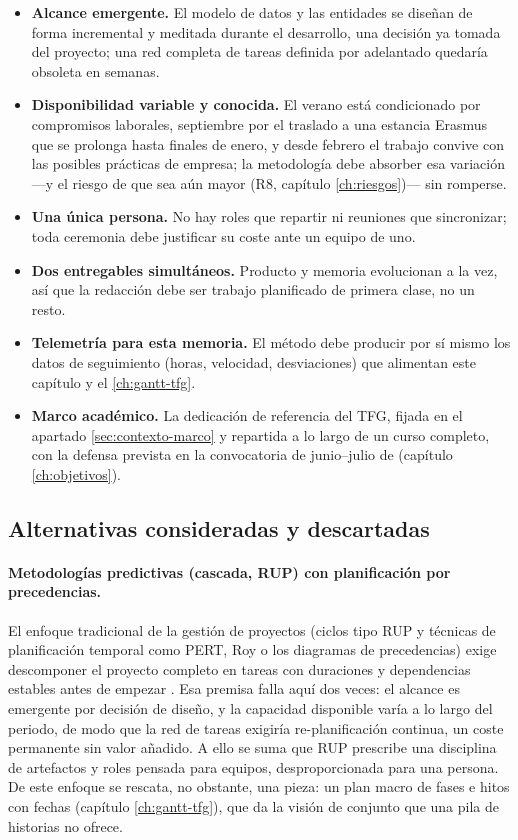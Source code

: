 \begin{itemize}
  \item \textbf{Alcance emergente.}
        El modelo de datos y las entidades se diseñan de forma incremental y meditada durante el desarrollo, una decisión ya tomada del proyecto; una red completa de tareas definida por adelantado quedaría obsoleta en semanas.
  \item \textbf{Disponibilidad variable y conocida.}
        El verano está condicionado por compromisos laborales, septiembre por el traslado a una estancia Erasmus que se prolonga hasta finales de enero, y desde febrero el trabajo convive con las posibles prácticas de empresa; la metodología debe absorber esa variación —y el riesgo de que sea aún mayor (R8, capítulo \ref{ch:riesgos})— sin romperse.
  \item \textbf{Una única persona.}
        No hay roles que repartir ni reuniones que sincronizar; toda ceremonia debe justificar su coste ante un equipo de uno.
  \item \textbf{Dos entregables simultáneos.}
        Producto y memoria evolucionan a la vez, así que la redacción debe ser trabajo planificado de primera clase, no un resto.
  \item \textbf{Telemetría para esta memoria.}
        El método debe producir por sí mismo los datos de seguimiento (horas, velocidad, desviaciones) que alimentan este capítulo y el \ref{ch:gantt-tfg}.
  \item \textbf{Marco académico.}
        La dedicación de referencia del \ac{TFG}, fijada en el apartado \ref{sec:contexto-marco} y repartida a lo largo de un curso completo, con la defensa prevista en la convocatoria de junio--julio de \thesisYear{} (capítulo \ref{ch:objetivos}).
\end{itemize}

\subsection{Alternativas consideradas y descartadas}
\label{sec:metodologia-alternativas}

\paragraph{Metodologías predictivas (cascada, \acs{RUP}) con planificación por precedencias.}
El enfoque tradicional de la gestión de proyectos (ciclos tipo \ac{RUP} y técnicas de planificación temporal como \ac{PERT}, Roy o los diagramas de precedencias) exige descomponer el proyecto completo en tareas con duraciones y dependencias estables antes de empezar \parencite{kruchten-rup, pmi-pmbok}.
Esa premisa falla aquí dos veces: el alcance es emergente por decisión de diseño, y la capacidad disponible varía a lo largo del periodo, de modo que la red de tareas exigiría re-planificación continua, un coste permanente sin valor añadido.
A ello se suma que \ac{RUP} prescribe una disciplina de artefactos y roles pensada para equipos, desproporcionada para una persona.
De este enfoque se rescata, no obstante, una pieza: un plan macro de fases e hitos con fechas (capítulo \ref{ch:gantt-tfg}), que da la visión de conjunto que una pila de historias no ofrece.

